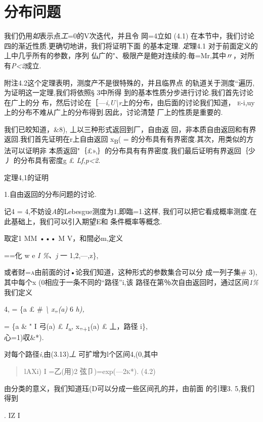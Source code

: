 \section{分布问题}

我们仍用\emph{如}表示点\emph{工}=0的V次迭代，并且令
岡=4立如 (4.1)
在本节中，我们讨论四的渐近性质.更确切地讲，我们将证明下面 的基本定理.
\emph{定}理4.1 对于前面定义的丄中几乎所有的参数，序列
仏广的"、极限产是鲍对连续的:毎=Mr,其中〃，对所
有\emph{P\textless{}2}成立.

附注4.2这个定理表明，测度产不是很特殊的，并且临界点
的轨道关于测度``遍历,为证明这一定理,我们将依照§ 3中所得
到的基本性质分步进行讨论.我们首先讨论在广上的分
布，然后讨论在［---\emph{i,U\textbackslash{}r}上的分布，由后面的讨论我们知道，
\textsc{e-}i,uy 上的分布不难从广上的分布得到.因此，讨论清楚
厂上的性质是重要的.

我们已皎知道，\&8), 丄以三种形式返回到厂，自由返
回，非本质自由返回和有界返回.我们首先证明在r上自由返回
x\textsubscript{B}( = 的分布具有有界密度.其次，用类似的方法可以证明非
本质返回"｛£»,｝的分布具有有界密度.我们最后证明有界返回｛少丿
的分布具有密度g £ \emph{Lf,p\textless{}2.}

定理4,1的证明

1.自由返回的分布问题的讨论.

记4 = 4,不妨设\emph{A}的Lebesgue测度为1,即臨=1.这样,
我们可以把它看成概率测度.在此基础上，我们可以引入期望E和 条件概率等概念.

取定1 MM ••• M V，和間必m,定义

==化 w e \emph{I \%、j} 一 1,2,---,z\},

或者财=\textsc{a}由前面的讨•论我们知道，这种形式的参数集合可以分
成一列子集\# 3),其中每个x (0相应于一条不同的``路径''i,该
路径在第％次自由返回时，通过区间\emph{1\%}我们定义

4, = \{a £ \# \emph{\textbackslash{} x„(a)} 6 \emph{h),}

= \{a \& " I 弓(a) £ \emph{I\textsubscript{u},} x„\textsubscript{+1}(a)
£ 丄，路径 i\},\\
心=1)収\&*).

对每个路径\emph{i,}由(3.13)\emph{丄} 可扩增为l个区间4,(0,其中

\begin{quote}
lAXi) I =乙(用)2 弦卩)=exp(---\textsc{2k*).} (4.2)
\end{quote}

由分类的意义，我们知道珏(D可以分成一些区间孔的并，由前面 的引理3.
5,我们得到

. IZ I

